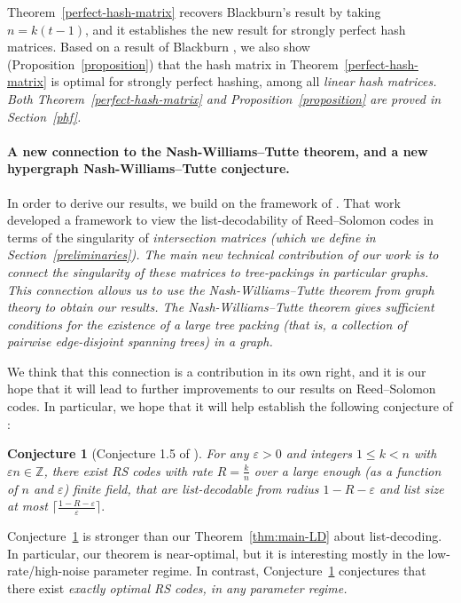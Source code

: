 \documentclass[11pt]{article}
\newtheorem{conjecture}[theorem]{Conjecture}
\renewcommand{\epsilon}{\varepsilon}
\begin{document}
Theorem~\ref{perfect-hash-matrix} recovers Blackburn's result by taking $n=k(t-1)$, and it establishes the new result for strongly perfect hash matrices.
Based on a result of Blackburn \cite{Blackburn1998Optimal}, we also show (Proposition~\ref{proposition}) that the hash matrix in Theorem~\ref{perfect-hash-matrix} is optimal for strongly perfect hashing, among all \em linear \em hash matrices.  Both Theorem~\ref{perfect-hash-matrix} and Proposition~\ref{proposition} are proved in Section~\ref{phf}.



\paragraph{A new connection to the Nash-Williams--Tutte theorem, and a new hypergraph Nash-Williams--Tutte conjecture.}
In order to derive our results, we build on the framework of \cite{shangguan2019combinatorial0}.
That work developed a framework to view the list-decodability of Reed--Solomon codes in terms of the singularity of \em intersection matrices \em (which we define in Section~\ref{preliminaries}).  The main new technical contribution of our work is to connect the singularity of these matrices to tree-packings in particular graphs.  This connection allows us to use the Nash-Williams--Tutte theorem from graph theory to obtain our results.   The Nash-Williams--Tutte theorem gives sufficient conditions for the existence of a large \em tree packing \em (that is, a collection of pairwise edge-disjoint spanning trees) in a graph.

We think that this connection is a contribution in its own right, and it is our hope that it will lead to further improvements to our results on Reed--Solomon codes.  In particular, we hope that it will help establish the following conjecture of \cite{shangguan2019combinatorial0}:

\begin{conjecture}[Conjecture 1.5 of \cite{shangguan2019combinatorial0}]\label{conjecture-0}
 For any $\epsilon>0$ and integers $1\le k<n$ with $\epsilon n\in\mathbb{Z}$, there exist RS codes with rate $R=\frac{k}{n}$ over a large enough (as a function of $n$ and $\epsilon$) finite field, that are list-decodable from radius $1-R-\epsilon$ and list size at most $\lceil\frac{1-R-\epsilon}{\epsilon}\rceil.$
\end{conjecture}

Conjecture~\ref{conjecture-0} is stronger than our Theorem~\ref{thm:main-LD} about list-decoding.  In particular, our theorem is near-optimal, but it is interesting mostly in the low-rate/high-noise parameter regime.  In contrast, Conjecture~\ref{conjecture-0} conjectures that there exist \em exactly \em optimal RS codes, in any parameter regime.
\end{document}
